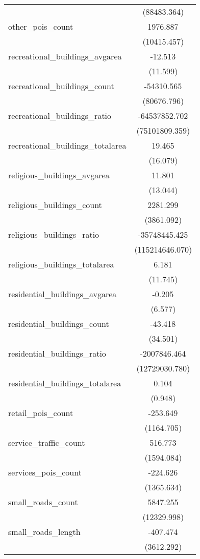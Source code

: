 \begin{table}[!htbp]
\begin{tabular}{@{\extracolsep{5pt}}lc}
  & (88483.364) \\
 other_pois_count & 1976.887$^{}$ \\
  & (10415.457) \\
 recreational_buildings_avgarea & -12.513$^{}$ \\
  & (11.599) \\
 recreational_buildings_count & -54310.565$^{}$ \\
  & (80676.796) \\
 recreational_buildings_ratio & -64537852.702$^{}$ \\
  & (75101809.359) \\
 recreational_buildings_totalarea & 19.465$^{}$ \\
  & (16.079) \\
 religious_buildings_avgarea & 11.801$^{}$ \\
  & (13.044) \\
 religious_buildings_count & 2281.299$^{}$ \\
  & (3861.092) \\
 religious_buildings_ratio & -35748445.425$^{}$ \\
  & (115214646.070) \\
 religious_buildings_totalarea & 6.181$^{}$ \\
  & (11.745) \\
 residential_buildings_avgarea & -0.205$^{}$ \\
  & (6.577) \\
 residential_buildings_count & -43.418$^{}$ \\
  & (34.501) \\
 residential_buildings_ratio & -2007846.464$^{}$ \\
  & (12729030.780) \\
 residential_buildings_totalarea & 0.104$^{}$ \\
  & (0.948) \\
 retail_pois_count & -253.649$^{}$ \\
  & (1164.705) \\
 service_traffic_count & 516.773$^{}$ \\
  & (1594.084) \\
 services_pois_count & -224.626$^{}$ \\
  & (1365.634) \\
 small_roads_count & 5847.255$^{}$ \\
  & (12329.998) \\
 small_roads_length & -407.474$^{}$ \\
  & (3612.292) \\

\end{tabular}
\end{table}
